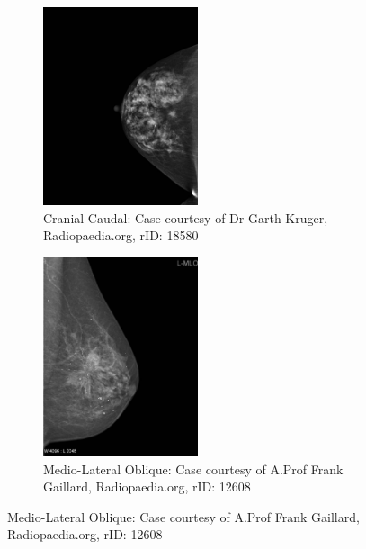 \begin{figure}[!ht]
  \center
  \begin{subfigure}[ht!]{0.4\textwidth}
        \includegraphics[width=0.5\textwidth]{Chapter1/background-img/CC.jpg}
        \caption{Cranial-Caudal: Case courtesy of Dr Garth Kruger, Radiopaedia.org, rID: 18580}
        \label{fig:CC}
    \end{subfigure}
    \hspace{\fill}
    \begin{subfigure}[ht!]{0.4\textwidth}
          \includegraphics[width=0.5\textwidth]{Chapter1/background-img/MLO.jpg}
          \caption{Medio-Lateral Oblique: Case courtesy of A.Prof Frank Gaillard, Radiopaedia.org, rID: 12608}
          \label{fig:MLO}
    \end{subfigure}


\end{figure}
